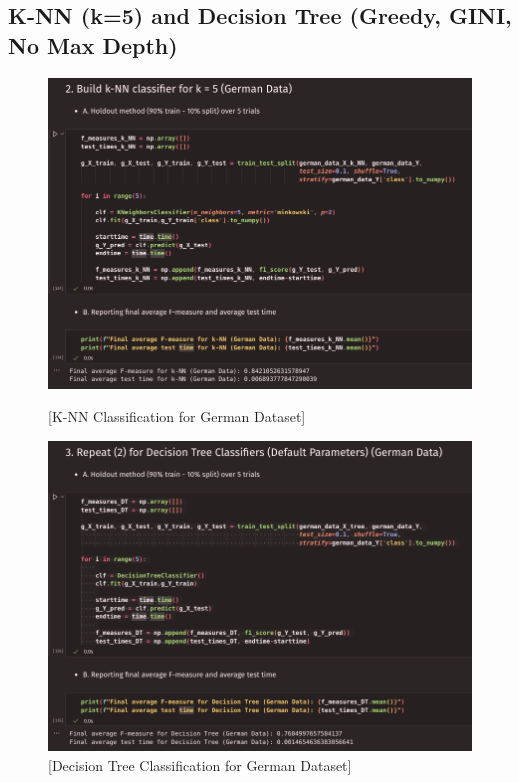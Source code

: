 \documentclass{article}
\begin{document}
    \subsection*{K-NN (k=5) and Decision Tree (Greedy, GINI, No Max Depth)}

    \begin{figure}[H]
        \centering
        \begin{minipage}[t]{0.48\textwidth}
            \centering
            \includegraphics[width=\textwidth, height=0.25\textheight]{./I_2_g_a.png}
            \caption{[K-NN Classification for German Dataset]}
        \end{minipage}
        \hfill
        \begin{minipage}[t]{0.48\textwidth}
            \centering
            \includegraphics[width=\textwidth, height=0.25\textheight]{./I_2_g_b.png}
            \caption{[Decision Tree Classification for German Dataset]}
        \end{minipage}
    \end{figure}
\end{document}
